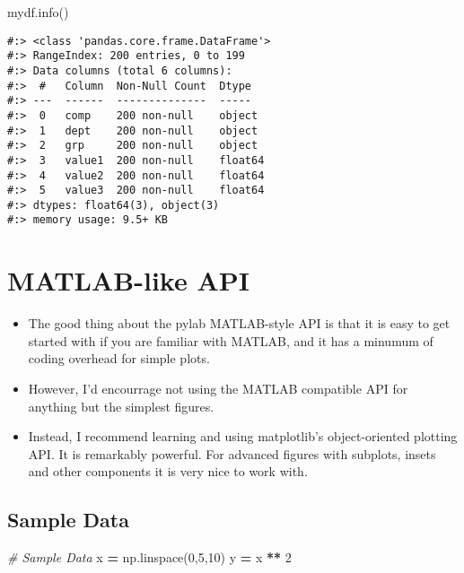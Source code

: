 \documentclass[
]{book}
\newenvironment{Shaded}{\begin{snugshade}}{\end{snugshade}}
\newcommand{\CommentTok}[1]{\textcolor[rgb]{0.37,0.37,0.37}{\textit{#1}}}
\newcommand{\DecValTok}[1]{\textcolor[rgb]{0.06,0.06,0.06}{#1}}
\newcommand{\NormalTok}[1]{#1}
\newcommand{\OperatorTok}[1]{\textcolor[rgb]{0.43,0.43,0.43}{\textbf{#1}}}
\providecommand{\tightlist}{%
  \setlength{\itemsep}{0pt}\setlength{\parskip}{0pt}}
\begin{document}
\begin{Shaded}
\begin{Highlighting}[]
\NormalTok{mydf.info()}
\end{Highlighting}
\end{Shaded}

\begin{verbatim}
#:> <class 'pandas.core.frame.DataFrame'>
#:> RangeIndex: 200 entries, 0 to 199
#:> Data columns (total 6 columns):
#:>  #   Column  Non-Null Count  Dtype  
#:> ---  ------  --------------  -----  
#:>  0   comp    200 non-null    object 
#:>  1   dept    200 non-null    object 
#:>  2   grp     200 non-null    object 
#:>  3   value1  200 non-null    float64
#:>  4   value2  200 non-null    float64
#:>  5   value3  200 non-null    float64
#:> dtypes: float64(3), object(3)
#:> memory usage: 9.5+ KB
\end{verbatim}

\hypertarget{matlab-like-api}{%
\section{MATLAB-like API}\label{matlab-like-api}}

\begin{itemize}
\tightlist
\item
  The good thing about the pylab MATLAB-style API is that it is easy to get started with if you are familiar with MATLAB, and it has a minumum of coding overhead for simple plots.\\
\item
  However, I'd encourrage not using the MATLAB compatible API for anything but the simplest figures.\\
\item
  Instead, I recommend learning and using matplotlib's object-oriented plotting API. It is remarkably powerful. For advanced figures with subplots, insets and other components it is very nice to work with.
\end{itemize}

\hypertarget{sample-data-17}{%
\subsection{Sample Data}\label{sample-data-17}}

\begin{Shaded}
\begin{Highlighting}[]
\CommentTok{\# Sample Data}
\NormalTok{x }\OperatorTok{=}\NormalTok{ np.linspace(}\DecValTok{0}\NormalTok{,}\DecValTok{5}\NormalTok{,}\DecValTok{10}\NormalTok{)}
\NormalTok{y }\OperatorTok{=}\NormalTok{ x }\OperatorTok{**} \DecValTok{2}
\end{Highlighting}
\end{Shaded}
\end{document}
